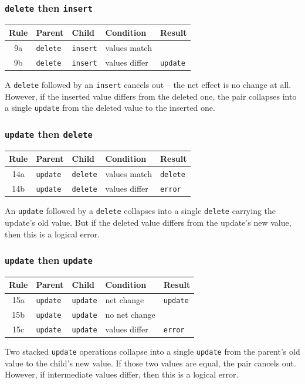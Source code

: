 \documentclass{beamer}
\begin{document}
\begin{frame}
\frametitle{\texttt{delete} then \texttt{insert}}
\begin{table}
\centering
\begin{tabular}{cllll}
Rule & Parent & Child & Condition & Result \\
\hline
9a & \texttt{delete} & \texttt{insert} & values match  &                 \\
9b & \texttt{delete} & \texttt{insert} & values differ & \texttt{update} \\
\end{tabular}
\end{table}
\begin{example}
A \texttt{delete} followed by an \texttt{insert} cancels out -- the net effect
is no change at all. However, if the inserted value differs from the deleted
one, the pair collapses into a single \texttt{update} from the deleted value to
the inserted one.
\end{example}
\end{frame}

\begin{frame}
\frametitle{\texttt{update} then \texttt{delete}}
\begin{table}
\centering
\begin{tabular}{cllll}
Rule & Parent & Child & Condition & Result \\
\hline
14a & \texttt{update} & \texttt{delete} & values match  & \texttt{delete} \\
14b & \texttt{update} & \texttt{delete} & values differ & \texttt{error}  \\
\end{tabular}
\end{table}
\begin{example}
An \texttt{update} followed by a \texttt{delete} collapses into a single
\texttt{delete} carrying the update's old value. But if the deleted value
differs from the update's new value, then this is a logical error.
\end{example}
\end{frame}

\begin{frame}
\frametitle{\texttt{update} then \texttt{update}}
\begin{table}
\centering
\begin{tabular}{cllll}
Rule & Parent & Child & Condition & Result \\
\hline
15a & \texttt{update} & \texttt{update} & net change    & \texttt{update} \\
15b & \texttt{update} & \texttt{update} & no net change &                 \\
15c & \texttt{update} & \texttt{update} & values differ & \texttt{error}  \\
\end{tabular}
\end{table}
\begin{example}
Two stacked \texttt{update} operations collapse into a single \texttt{update}
from the parent's old value to the child's new value. If those two values are
equal, the pair cancels out. However, if intermediate values differ, then this
is a logical error.
\end{example}
\end{frame}
\end{document}
